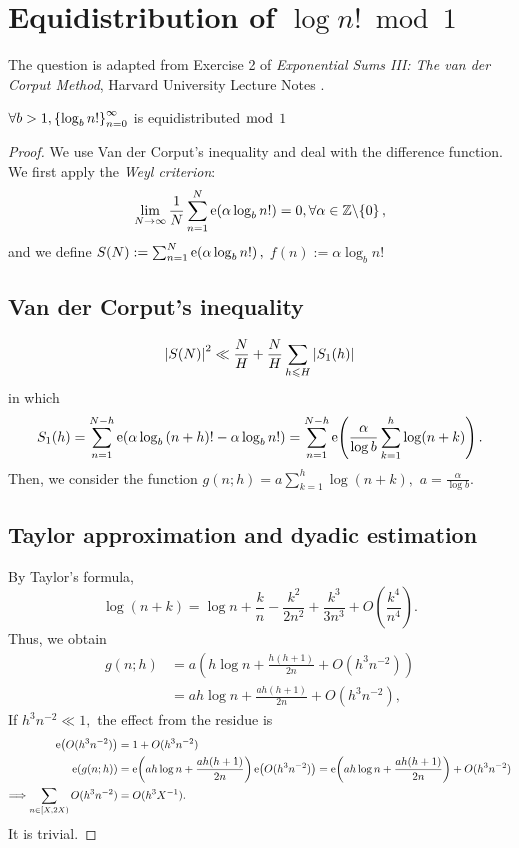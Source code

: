 \section{Equidistribution of $\log n! \bmod 1$}
The question is adapted from Exercise 2 of \emph{Exponential Sums III: The van der Corput Method}, Harvard University Lecture Notes \cite{ElkiesVdC}.
\begin{theorem}
    $\forall b > 1, \left\{ \log_b{n!} \right\}_{n=0}^\infty$ is equidistributed $\bmod$ $1$ 
\end{theorem}

\begin{proof} We use Van der Corput's inequality and deal with the difference function. We first apply the \emph{Weyl criterion}: $$\lim_{N \rightarrow \infty} \frac{1}{N} \sum_{n = 1}^N \operatorname{e} \! \left( \alpha \log_b {n!} \right) = 0, \forall \alpha \in \mathbb{Z} \backslash\!\left\{ 0 \right\},$$ and we define $S(N) := \sum_{n = 1}^N \operatorname{e} \! \left( \alpha \log_b {n!} \right),$ $f(n) := \alpha \log_b {n!}$ 

\subsection{Van der Corput's inequality}
$$\left\lvert S(N) \right\rvert^2 \ll \frac{N}{H} + \frac{N}{H} \sum_{h \leqslant H} \left\lvert S_1(h) \right\rvert$$ in which $$S_1(h) = \sum_{n = 1}^{N-h} \operatorname{e} \! \left( \alpha \log_b {(n+h)!} - \alpha \log_b{n!} \right) = \sum_{n = 1}^{N-h} \operatorname{e} \! \left( \frac{\alpha}{\log{b}} \sum_{k = 1}^h \log(n+k) \right).$$ Then, we consider the function $g(n;h) = a \sum_{k = 1}^h \log(n+k),$ $a = \frac{\alpha}{\log{b}}.$ 

\subsection{Taylor approximation and dyadic estimation}
By Taylor's formula,
$$\log{(n+k)} = \log{n} + \frac{k}{n} - \frac{k^2}{2n^2} + \frac{k^3}{3n^3} + O(\frac{k^4}{n^4}).$$ Thus, we obtain 
\begin{align*}
    g(n;h) &= a\left(h \log{n} + \frac{h(h+1)}{2n} + O(h^3n^{-2}) \right) \\
    &= ah \log{n} + \frac{ah(h+1)}{2n} + O(h^3n^{-2}),
\end{align*}
If $h^{3}n^{-2} \ll 1,$ the effect from the residue is 
\begin{align*}
    \operatorname{e} \! \left( O(h^3n^{-2}) \right) &= 1 + O(h^3n^{-2}) \\
    \operatorname{e} \! \left( g(n; h) \right) &= \operatorname{e} \! \left( ah \log{n} + \frac{ah(h+1)}{2n} \right) \operatorname{e} \! \left( O(h^3n^{-2}) \right) = \operatorname{e} \! \left( ah \log{n} + \frac{ah(h+1)}{2n} \right) + O(h^3n^{-2}) \\
    \Longrightarrow \sum_{n \in [X, 2X)} O(h^3n^{-2}) &= O(h^3X^{-1}).
\end{align*}
It is trivial.


\end{proof}

